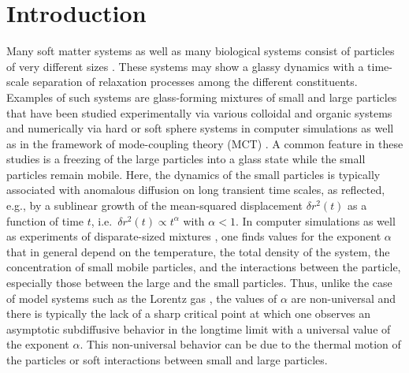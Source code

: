 \section{Introduction}
%
Many soft matter systems as well as many biological systems consist of particles of very different sizes \cite{bechinger2013, weiss2014, hoefling2013}. These systems may show a glassy dynamics with a time-scale separation of relaxation processes among the different constituents. Examples of such systems are glass-forming mixtures of small and large particles that have been studied experimentally via various colloidal and organic systems \cite{imhof1995_1, imhof1995_2, kurita2010, blochowicz2012, bierwirth2018, sentjabrskaja2016, laurati2019} and numerically via hard or soft sphere systems in computer simulations \cite{moreno2006, horbach2009, xu2012, xu2015, lazaro2019} as well as in the framework of mode-coupling theory (MCT) \cite{bosse1987, bosse1995, voigtmann2011}. A common feature in these studies is a freezing of the large particles into a glass state while the small particles remain mobile.  Here, the dynamics of the small particles is typically associated with anomalous diffusion on long transient time scales, as reflected, e.g., by a sublinear growth of the mean-squared displacement $\delta r^2(t)$ as a function of time $t$, i.e.~$\delta r^2(t) \propto t^\alpha$ with $\alpha<1$. In computer simulations as well as experiments of disparate-sized mixtures \cite{kurita2010, blochowicz2012, horbach2009, schnyder2018, kurzidim2011}, one finds values for the exponent $\alpha$ that in general depend on the temperature, the total density of the system, the concentration of small mobile particles, and the interactions between the particle, especially those between the large and the small particles. Thus, {unlike the case of model systems such as the Lorentz gas \cite{hoefling2013, schnyder2018}}, the values of $\alpha$ are non-universal and there is typically the lack of a sharp critical point at which one observes an asymptotic subdiffusive behavior in the longtime limit with a universal value of the exponent $\alpha$.  This non-universal behavior can be due to the thermal motion of the particles or soft interactions between small and large particles.

